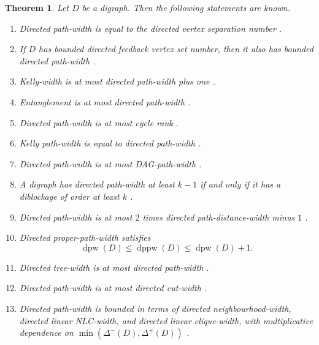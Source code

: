 \documentclass[10pt]{book}
\newtheorem{theorem}{Theorem}[section]
\theoremstyle{definition}
\begin{document}
\begin{theorem}
\cite{FujitaDirectedPath2024}
Let \(D\) be a digraph. Then the following statements are known.
\begin{enumerate}
    \item Directed path-width is equal to the directed vertex separation number \cite{bodlaender1998linear}.

    \item If \(D\) has bounded directed feedback vertex set number, then it also has bounded directed path-width \cite{Niedermeier2010ReflectionsOM}.

    \item Kelly-width is at most directed path-width plus one \cite{ganian2014digraph}.

    \item Entanglement is at most directed path-width \cite{rabinovich2008complexity}.

    \item Directed path-width is at most cycle rank \cite{gruber2012digraph}.

    \item Kelly path-width is equal to directed path-width \cite{kintali2015approximation}.

    \item Directed path-width is at most DAG-path-width \cite{kasahara2023dag}.

    \item A digraph has directed path-width at least \(k-1\) if and only if it has a diblockage of order at least \(k\) \cite{erde2020directed}.

    \item Directed path-width is at most \(2\) times directed path-distance-width minus \(1\) \cite{FujitaDirectedPath2024}.

    \item Directed proper-path-width satisfies
    \[
    \operatorname{dpw}(D)\leq \operatorname{dppw}(D)\leq \operatorname{dpw}(D)+1.
    \]
    \cite{FujitaDirectedPath2024}

    \item Directed tree-width is at most directed path-width \cite{gurski2019comparing}.

    \item Directed path-width is at most directed cut-width \cite{gurski2019comparing}.

    \item Directed path-width is bounded in terms of directed neighbourhood-width, directed linear NLC-width, and directed linear clique-width, with multiplicative dependence on \(\min(\Delta^-(D),\Delta^+(D))\) \cite{gurski2019comparing}.
\end{enumerate}
\end{theorem}
\end{document}
